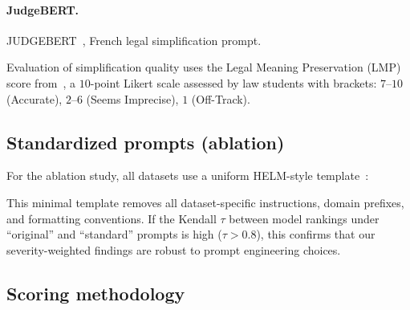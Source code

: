 \paragraph{JudgeBERT.}
JUDGEBERT~\cite{judgebert2025}, French legal simplification prompt.


Evaluation of simplification quality uses the Legal Meaning
Preservation (LMP) score from~\cite{judgebert2025}, a $10$-point
Likert scale assessed by law students with brackets: $7$--$10$
(Accurate), $2$--$6$ (Seems Imprecise), $1$ (Off-Track).

\subsection{Standardized prompts (ablation)}
\label{sec:standard-prompts}

For the ablation study, all datasets use a uniform HELM-style
template~\cite{liang2023helm}:


This minimal template removes all dataset-specific instructions,
domain prefixes, and formatting conventions. If the Kendall $\tau$
between model rankings under \enquote{original} and \enquote{standard} prompts is
high ($\tau > 0.8$), this confirms that our severity-weighted findings
are robust to prompt engineering choices.

\subsection{Scoring methodology}

